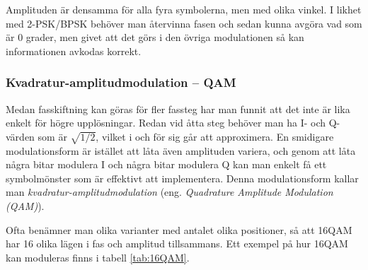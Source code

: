 Amplituden är densamma för alla fyra symbolerna, men med olika vinkel.
I likhet med 2-PSK/BPSK behöver man återvinna fasen och sedan kunna avgöra
vad som är 0 grader, men givet att det görs i den övriga modulationen så
kan informationen avkodas korrekt.

\subsubsection{Kvadratur-amplitudmodulation -- QAM}
\label{QAM}

Medan fasskiftning kan göras för fler fassteg har man funnit att det inte
är lika enkelt för högre upplösningar. Redan vid åtta steg behöver man ha
I- och Q-värden som är \(\sqrt{1/2}\), vilket i och för sig går att approximera.
En smidigare modulationsform är istället att låta även amplituden variera,
och genom att låta några bitar modulera I och några bitar modulera Q kan
man enkelt få ett symbolmönster som är effektivt att implementera.
Denna modulationsform kallar man \emph{kvadratur-amplitudmodulation}
(eng. \emph{Quadrature Amplitude Modulation (QAM)}).

Ofta benämner man olika varianter med antalet olika positioner, så att 16QAM
har 16 olika lägen i fas och amplitud tillsammans.
Ett exempel på hur 16QAM kan moduleras finns i tabell \ref{tab:16QAM}.

